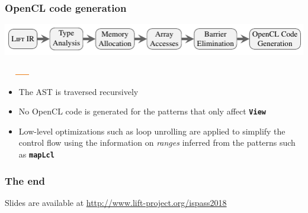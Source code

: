 \documentclass[10pt]{beamer}
\newcommand{\code}[1]{\textbf{\texttt{#1}}}
\begin{document}
\begin{frame}[t]
\frametitle{OpenCL code generation}
    \vspace{-1cm}
    \begin{block}{}
        \begin{center}
            \includegraphics[width=1\textwidth]{../images/compilation_stages.pdf}
        \end{center}
        \vspace{-1.05cm}
        \hspace{8.9cm}
        \includegraphics[width=1.57cm, height=0.03cm]{../images/orange_bar.png}
        \vspace{.45cm}
    \end{block}
    \vspace{-0.5cm}
\begin{itemize}
	\item The AST is traversed recursively
	\item No OpenCL code is generated for the patterns that only affect \code{View}
	\item Low-level optimizations such as loop unrolling are applied to simplify the control flow using the information on \textit{ranges} inferred from the patterns such as \code{mapLcl}
\end{itemize}
\end{frame}

\begin{frame}
\frametitle{The end}
\begin{center}
Slides are available at
\textcolor{blue}{\url{http://www.lift-project.org/ispass2018}}
\end{center}
\end{frame}
\end{document}
